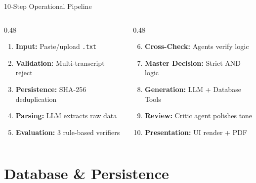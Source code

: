 \documentclass[aspectratio=169]{beamer}
\begin{document}
\begin{frame}{10-Step Operational Pipeline}
  \begin{columns}[T]
    \begin{column}{0.48\textwidth}
      \begin{enumerate}
        \item \textbf{Input:} Paste/upload \texttt{.txt}
        \item \textbf{Validation:} Multi-transcript reject
        \item \textbf{Persistence:} SHA-256 deduplication
        \item \textbf{Parsing:} LLM extracts raw data
        \item \textbf{Evaluation:} 3 rule-based verifiers
      \end{enumerate}
    \end{column}
    \begin{column}{0.48\textwidth}
      \begin{enumerate}
        \setcounter{enumi}{5}
        \item \textbf{Cross-Check:} Agents verify logic
        \item \textbf{Master Decision:} Strict AND logic
        \item \textbf{Generation:} LLM + Database Tools
        \item \textbf{Review:} Critic agent polishes tone
        \item \textbf{Presentation:} UI render + PDF
      \end{enumerate}
    \end{column}
  \end{columns}
\end{frame}


\section{Database \& Persistence}
\end{document}
